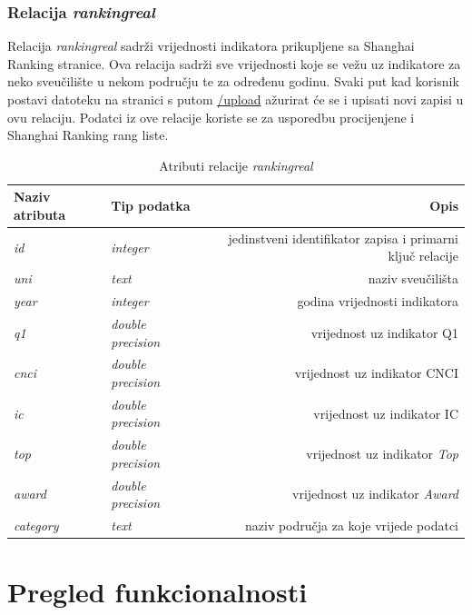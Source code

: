 \documentclass[times, utf8, zavrsni]{fer}
\begin{document}
           \newpage \subsection{Relacija \emph{rankingreal}}   
           Relacija \emph{rankingreal} sadrži vrijednosti indikatora prikupljene sa Shanghai Ranking stranice. Ova relacija sadrži sve 
           vrijednosti koje se vežu uz indikatore za neko sveučilište u nekom području te za određenu godinu. Svaki put kad korisnik 
           postavi datoteku na stranici s putom \url{/upload} ažurirat će se i upisati novi zapisi u ovu relaciju. Podatci iz ove 
           relacije koriste se za usporedbu procijenjene i Shanghai Ranking rang liste.
           \begin{table}[htb]
            \caption{Atributi relacije \emph{rankingreal}}
                \label{tbl:rankingreal}
                \centering
                \begin{tabular}{llr} \hline
                Naziv atributa & Tip podatka & Opis\\ \hline
                \emph{id} &  \emph{integer} & jedinstveni identifikator zapisa i primarni ključ relacije\\
                \emph{uni} &  \emph{text} & naziv sveučilišta\\
                \emph{year} &  \emph{integer} & godina vrijednosti indikatora\\
                \emph{q1} &  \emph{double precision} & vrijednost uz indikator Q1\\
                \emph{cnci} &  \emph{double precision} & vrijednost uz indikator CNCI\\
                \emph{ic} &  \emph{double precision} & vrijednost uz indikator IC\\
                \emph{top} &  \emph{double precision} & vrijednost uz indikator \emph{Top}\\
                \emph{award} &  \emph{double precision} & vrijednost uz indikator \emph{Award}\\
                \emph{category} &  \emph{text} & naziv područja za koje vrijede podatci\\
                \end{tabular}
                \end{table}
                \FloatBarrier 
\chapter{Pregled funkcionalnosti}
\end{document}
